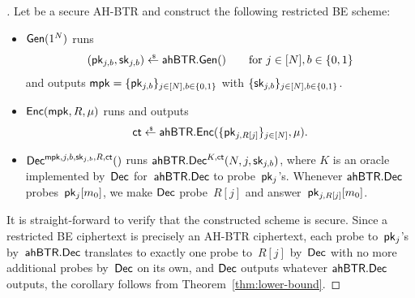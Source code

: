 \begin{proof}[]
Let
be a secure AH-BTR and
construct the following restricted BE scheme:
\begin{itemize}
\item $\Gen(1^N)$ runs
\begin{align*}
(\pk_{j,b},\sk_{j,b})\draws\AHBTR.\Gen()\qquad\textup{for }j\in[N],b\in\bit
\end{align*}
and outputs ${\mpk=\{\pk_{j,b}\}_{j\in[N],b\in\bit}}$ with $\{\sk_{j,b}\}_{j\in[N],b\in\bit}$.
\item $\Enc(\mpk,R,\mu)$ runs and outputs
\begin{align*}
\ct\draws\AHBTR.\Enc(\{\pk_{j,R[j]}\}_{j\in[N]},\mu).
\end{align*}
\item $\Dec^{\mpk,j,b,\sk_{j,b},R,\ct}()$
runs $\AHBTR.\Dec^{K,\ct}(N,j,\sk_{j,b})$,
where $K$ is an oracle implemented by~$\Dec$ for~$\AHBTR.\Dec$ to probe~$\pk_j$'s.
Whenever $\AHBTR.\Dec$ probes~$\pk_j[m_0]$,
we make $\Dec$ probe~$R[j]$ and answer~$\pk_{j,R[j]}[m_0]$.
\end{itemize}
It is straight-forward to verify that the constructed scheme is secure.
Since
a restricted BE ciphertext is precisely an AH-BTR ciphertext,
each probe to~$\pk_j$'s by~$\AHBTR.\Dec$ translates to exactly one probe to~$R[j]$ by~$\Dec$ with no more additional probes by~$\Dec$ on its own, and
$\Dec$ outputs whatever $\AHBTR.\Dec$ outputs,
the corollary follows from Theorem~\ref{thm:lower-bound}.
\end{proof}
